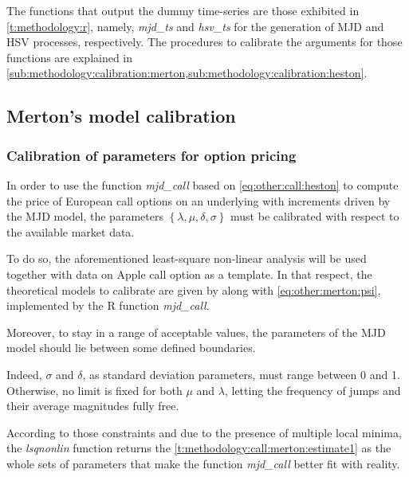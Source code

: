 \documentclass[12pt]{report}
\begin{document}
The functions that output the dummy time-series are those exhibited in \cref{t:methodology:r}, namely, \textit{mjd\_ts} and \textit{hsv\_ts} for the generation of  MJD and HSV processes, respectively.
The procedures to calibrate the arguments for those functions are explained in \cref{sub:methodology:calibration:merton,sub:methodology:calibration:heston}.










\subsection{Merton's model calibration}
\label{sub:methodology:calibration:merton}

\subsubsection*{Calibration of parameters for option pricing}

In order to use the function \textit{mjd\_call} based on \cref{eq:other:call:heston} to compute the price of European call options on an underlying with increments driven by the MJD model, the parameters $\left\{ \lambda, \mu, \delta ,\sigma \right\}$ must be calibrated with respect to the available market data.

To do so, the aforementioned least-square non-linear analysis will be used together with data on Apple call option as a template.
In that respect, the theoretical models to calibrate are given by  along with \cref{eq:other:merton:psi}, implemented by the R function \textit{mjd\_call}.

Moreover, to stay in a range of acceptable values, the parameters of the MJD model should lie between some defined boundaries. 

Indeed, $\sigma$ and $\delta$, as standard deviation parameters, must range between 0 and 1. 
Otherwise, no limit is fixed for both $\mu$ and $\lambda$, letting the frequency of jumps and their average magnitudes fully free.

According to those constraints and due to the presence of multiple local minima, the \textit{lsqnonlin} function returns the \cref{t:methodology:call:merton:estimate1} as the whole sets of parameters that make the function \textit{mjd\_call} better fit with reality.
\end{document}
